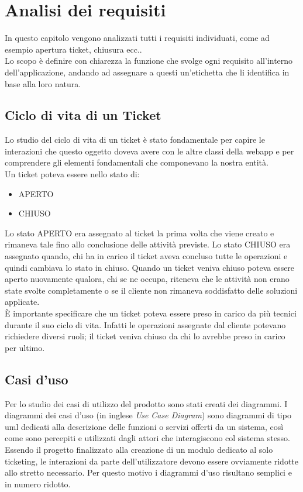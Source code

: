 \chapter{Analisi dei requisiti}
\label{cap:analisi-requisiti}

In questo capitolo vengono analizzati tutti i requisiti individuati, come ad esempio apertura ticket, chiusura ecc..\\
Lo scopo è definire con chiarezza la funzione che svolge ogni requisito all'interno dell'applicazione, andando  ad assegnare a questi un'etichetta che li identifica in base alla  loro natura.
\section{Ciclo di vita di un Ticket}
Lo studio del ciclo di vita di un ticket è stato fondamentale per capire le interazioni che questo oggetto doveva avere con le altre classi della webapp e per comprendere gli elementi fondamentali che componevano la nostra entità. \\
Un ticket poteva essere nello stato di:
\begin{itemize}
\item APERTO
\item CHIUSO
\end{itemize}
Lo stato APERTO era assegnato al ticket la prima volta che viene creato e rimaneva tale fino allo conclusione delle attività previste.
Lo stato CHIUSO era assegnato quando, chi ha in carico il ticket aveva concluso tutte le operazioni e quindi cambiava lo stato in chiuso.
Quando un ticket veniva chiuso poteva essere aperto nuovamente qualora, chi se ne occupa, riteneva che le attività non erano state svolte completamente o se il cliente non rimaneva soddisfatto delle soluzioni applicate.\\
È importante specificare che un ticket poteva essere preso in carico da più tecnici durante il suo ciclo di vita. Infatti le operazioni assegnate dal cliente potevano richiedere diversi ruoli; il ticket veniva chiuso da chi lo avrebbe preso in carico per ultimo.
\section{Casi d'uso}

Per lo studio dei casi di utilizzo del prodotto sono stati creati dei diagrammi.
I diagrammi dei casi d'uso (in inglese \emph{Use Case Diagram}) sono diagrammi di tipo \gls{uml} dedicati alla descrizione delle funzioni o servizi offerti da un sistema, così come sono percepiti e utilizzati dagli attori che interagiscono col sistema stesso.
Essendo il progetto finalizzato alla creazione di un modulo dedicato al solo ticketing, le interazioni da parte dell'utilizzatore devono essere ovviamente ridotte allo stretto necessario. Per questo motivo i diagrammi d'uso risultano semplici e in numero ridotto.

